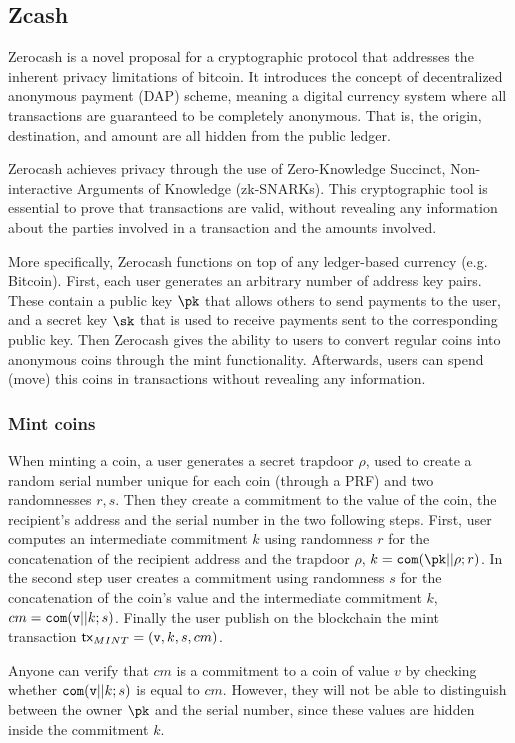 \subsection{Zcash}

Zerocash \cite{Zerocash} is a novel proposal for a cryptographic protocol that addresses the inherent privacy limitations of bitcoin. It introduces the concept of decentralized anonymous payment (DAP) scheme, meaning a digital currency system where all transactions are guaranteed to be completely anonymous. That is, the origin, destination, and amount are all hidden from the public ledger.

Zerocash achieves privacy through the use of Zero-Knowledge Succinct, Non-interactive Arguments of Knowledge (zk-SNARKs). This cryptographic tool is essential to prove that transactions are valid, without revealing any information about the parties involved in a transaction and the amounts involved. 

More specifically, Zerocash functions on top of any ledger-based currency (e.g. Bitcoin). First, each user generates an arbitrary number of address key pairs. These contain a public key $\pk$ that allows others to send payments to the user, and a secret key $\sk$ that is used to receive payments sent to the corresponding public key. Then Zerocash gives the ability to users to convert  regular coins into anonymous coins through the mint functionality. Afterwards, users can spend (move) this coins in transactions without revealing any information. 

\subsubsection{Mint coins}
When minting a coin, a user generates a secret trapdoor $\rho$, used to create a random serial number unique for each coin (through a PRF) and two randomnesses $r, s$. Then they create a commitment to the value of the coin, the recipient's address and the serial number in the two following steps. First, user computes an intermediate commitment $k$ using randomness $r$ for the concatenation of the recipient address and the trapdoor $\rho$, $k = \com(\pk||\rho ; r)$. In the second step user creates a commitment using randomness $s$ for the concatenation of the coin's value and the intermediate commitment $k$, $cm = \texttt{com}(\texttt{v}||k;s)$.
Finally the user publish on the blockchain the mint transaction $\textup{\textsf{tx}}_{MINT} = (\texttt{v}, k, s, cm)$. 

Anyone can verify that $cm$ is a commitment to a coin of value $v$ by checking whether $\texttt{com}(\texttt{v}||k;s)$ is equal to $cm$. However, they will not be able to distinguish between the owner $\pk$ and the serial number, since these values are hidden inside the commitment $k$.

